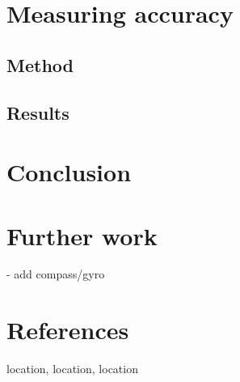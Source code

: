 \documentclass[twoside, 11pt]{uva-bachelor-thesis}
\begin{document}
\chapter{Measuring accuracy}

  \section{Method}
  \section{Results}

\chapter{Conclusion}

\chapter{Further work}
- add compass/gyro 

\chapter{References}
location, location, location



\end{document}
